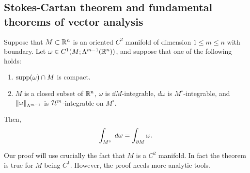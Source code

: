 \documentclass[a4paper]{article}
\begin{document}
\subsection{Stokes-Cartan theorem and fundamental theorems
of vector analysis}

\begin{thm}
Suppose that $M \subset \mathbb{R}^n$ is an oriented $C^2$ manifold
of dimension $1 \leq m \leq n$ with boundary. Let $\omega
\in C^1 (M; \Lambda^{m-1} (\mathbb{R}^n))$, and suppose that one of
the following holds:
\begin{enumerate}
  \item $\operatorname{supp} (\omega) \cap M$ is compact.
  \item $M$ is a closed subset of $\mathbb{R}^n$, $\omega$ is
  $\dd M$-integrable, $d \omega$ is $M^\circ$-integrable,
  and $\left\lVert \omega\right\rVert_{\Lambda^{m-1}}$ is $\mathcal{H}^m$-integrable
  on $M^\circ$.
\end{enumerate}
Then,
\[
\int_{M^\circ} \; d \omega = \int_{\partial M} \omega.
\]
\end{thm}

\begin{remark}
Our proof will use crucially the fact that $M$ is a $C^2$
manifold. In fact the theorem is true for $M$ being
$C^1$. However, the proof needs more analytic tools.
\end{remark}
\end{document}
